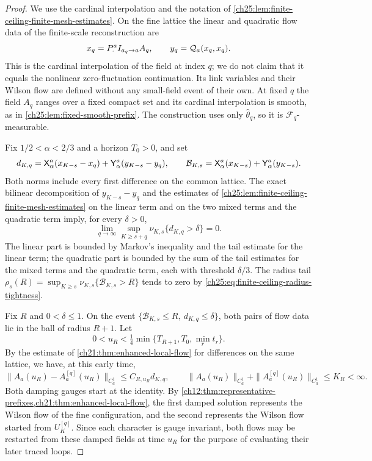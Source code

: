\begin{proof}
We use the cardinal interpolation and the notation of \cref{ch25:lem:finite-ceiling-finite-mesh-estimates}. On the fine lattice the linear and quadratic flow data of the finite-scale reconstruction are
\[
 x_q=P_{\cdot}^{a}I_{a_q\to a}A_q,\qquad y_q=\mathcal Q_{a}(x_q,x_q).
\]
This is the cardinal interpolation of the field at index $q$; we do not claim that it equals the nonlinear zero-fluctuation continuation. Its link variables and their Wilson flow are defined without any small-field event of their own. At fixed $q$ the field $A_q$ ranges over a fixed compact set and its cardinal interpolation is smooth, as in \cref{ch25:lem:fixed-smooth-prefix}. The construction uses only $\widehat\theta_q$, so it is $\mathcal F_q$-measurable.

Fix $1/2<\alpha<2/3$ and a horizon $T_0>0$, and set
\[
 d_{K,q}=\mathsf X_{\alpha}^{a}(x_{K-s}-x_q)+\mathsf Y_{\alpha}^{a}(y_{K-s}-y_q),\qquad \mathcal B_{K,s}=\mathsf X_{\alpha}^{a}(x_{K-s})+\mathsf Y_{\alpha}^{a}(y_{K-s}).
\]
Both norms include every first difference on the common lattice. The exact bilinear decomposition of $y_{K-s}-y_q$ and the estimates of \cref{ch25:lem:finite-ceiling-finite-mesh-estimates} on the linear term and on the two mixed terms and the quadratic term imply, for every $\delta>0$,
\begin{equation}\label{ch29:eq:two-grade-prefix-tail}
 \lim_{q\to\infty}\sup_{K\ge s+q}\nu_{K,s}\{d_{K,q}>\delta\}=0.
\end{equation}
The linear part is bounded by Markov's inequality and the tail estimate for the linear term; the quadratic part is bounded by the sum of the tail estimates for the mixed terms and the quadratic term, each with threshold $\delta/3$. The radius tail $\rho_s(R)=\sup_{K\ge s}\nu_{K,s}\{\mathcal B_{K,s}>R\}$ tends to zero by \eqref{ch25:eq:finite-ceiling-radius-tightness}.

Fix $R$ and $0<\delta\le1$. On the event $\{\mathcal B_{K,s}\le R,\ d_{K,q}\le\delta\}$, both pairs of flow data lie in the ball of radius $R+1$. Let
\[
 0<u_R<\tfrac14\min\{T_{R+1},T_0,\min_rt_r\}.
\]
By the estimate of \cref{ch21:thm:enhanced-local-flow} for differences on the same lattice, we have, at this early time,
\[
 \|A_a(u_R)-A_a^{[q]}(u_R)\|_{C_a^1}\le C_{R,u_R}d_{K,q},\qquad \|A_a(u_R)\|_{C_a^1}+\|A_a^{[q]}(u_R)\|_{C_a^1}\le K_R<\infty.
\]
Both damping gauges start at the identity. By \cref{ch12:thm:representative-prefixes,ch21:thm:enhanced-local-flow}, the first damped solution represents the Wilson flow of the fine configuration, and the second represents the Wilson flow started from $U_K^{[q]}$. Since each character is gauge invariant, both flows may be restarted from these damped fields at time $u_R$ for the purpose of evaluating their later traced loops.


\end{proof}
